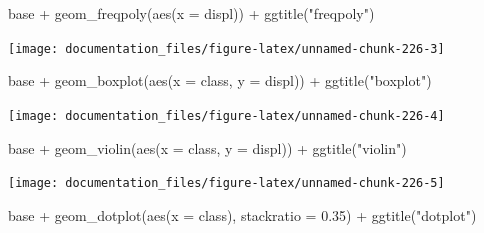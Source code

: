 \documentclass[
]{article}
\newenvironment{Shaded}{\begin{snugshade}}{\end{snugshade}}
\newcommand{\AttributeTok}[1]{\textcolor[rgb]{0.77,0.63,0.00}{#1}}
\newcommand{\FloatTok}[1]{\textcolor[rgb]{0.00,0.00,0.81}{#1}}
\newcommand{\FunctionTok}[1]{\textcolor[rgb]{0.00,0.00,0.00}{#1}}
\newcommand{\NormalTok}[1]{#1}
\newcommand{\SpecialCharTok}[1]{\textcolor[rgb]{0.00,0.00,0.00}{#1}}
\newcommand{\StringTok}[1]{\textcolor[rgb]{0.31,0.60,0.02}{#1}}
\begin{document}
\begin{Shaded}
\begin{Highlighting}[]
\NormalTok{base }\SpecialCharTok{+} \FunctionTok{geom\_freqpoly}\NormalTok{(}\FunctionTok{aes}\NormalTok{(}\AttributeTok{x =}\NormalTok{ displ)) }\SpecialCharTok{+} \FunctionTok{ggtitle}\NormalTok{(}\StringTok{"freqpoly"}\NormalTok{)}
\end{Highlighting}
\end{Shaded}

\begin{center}\texttt{[image: documentation\_files/figure-latex/unnamed-chunk-226-3]} \end{center}

\begin{Shaded}
\begin{Highlighting}[]
\NormalTok{base }\SpecialCharTok{+} \FunctionTok{geom\_boxplot}\NormalTok{(}\FunctionTok{aes}\NormalTok{(}\AttributeTok{x =}\NormalTok{ class, }\AttributeTok{y =}\NormalTok{ displ)) }\SpecialCharTok{+} \FunctionTok{ggtitle}\NormalTok{(}\StringTok{"boxplot"}\NormalTok{)}
\end{Highlighting}
\end{Shaded}

\begin{center}\texttt{[image: documentation\_files/figure-latex/unnamed-chunk-226-4]} \end{center}

\begin{Shaded}
\begin{Highlighting}[]
\NormalTok{base }\SpecialCharTok{+} \FunctionTok{geom\_violin}\NormalTok{(}\FunctionTok{aes}\NormalTok{(}\AttributeTok{x =}\NormalTok{ class, }\AttributeTok{y =}\NormalTok{ displ)) }\SpecialCharTok{+} \FunctionTok{ggtitle}\NormalTok{(}\StringTok{"violin"}\NormalTok{)}
\end{Highlighting}
\end{Shaded}

\begin{center}\texttt{[image: documentation\_files/figure-latex/unnamed-chunk-226-5]} \end{center}

\begin{Shaded}
\begin{Highlighting}[]
\NormalTok{base }\SpecialCharTok{+} \FunctionTok{geom\_dotplot}\NormalTok{(}\FunctionTok{aes}\NormalTok{(}\AttributeTok{x =}\NormalTok{ class), }\AttributeTok{stackratio =} \FloatTok{0.35}\NormalTok{) }\SpecialCharTok{+} \FunctionTok{ggtitle}\NormalTok{(}\StringTok{"dotplot"}\NormalTok{)}
\end{Highlighting}
\end{Shaded}
\end{document}
